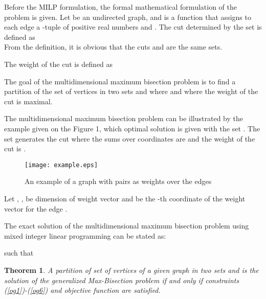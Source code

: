 \documentclass[10pt]{article}
\begin{document}
Before the MILP formulation, the formal mathematical formulation of the problem is given. 
Let  be an undirected graph, and  is a function that assigns to 
each edge  a -tuple of positive real numbers  and . 
The cut  determined by the set  is defined as \\

From the definition, it is obvious that the cuts  and  are the same sets.

The weight of the cut  
is defined as 
 
The goal of the multidimensional maximum bisection problem is to 
find a partition of the set of vertices in two sets  and  where  and where the weight of the cut 
 is maximal. 

The multidimensional maximum bisection problem can be illustrated by the example given on the  Figure 1, 
which optimal solution is given with the set .
The set  generates the cut      
where the sums over coordinates are  and the weight of the cut is
.

\begin{figure}[h]
	\centering   
		\texttt{[image: example.eps]}
		\caption{An example of a graph with pairs as weights over the edges}
	\label{fig:example}
\end{figure}





Let , ,  be dimension of weight vector and  be the -th coordinate of the weight vector for the edge .





The exact solution of the multidimensional maximum bisection problem using mixed integer linear programming 
can be stated as:



such that















\newtheorem{theorem}{Theorem}

\begin{theorem}
A partition of set of vertices of a given graph  in two sets  and  is the solution of the generalized Max-Bisection 
problem if and only if constraints (\ref{og1})-(\ref{og6}) and objective function are satisfied.
\end{theorem}
\end{document}
